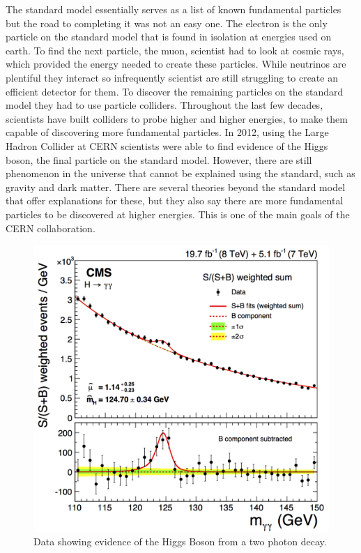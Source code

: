 The standard model essentially serves as a list of known fundamental particles but the road to completing it was not an easy one. The electron is the only particle on the standard model that is found in isolation at energies used on earth. To find the next particle, the muon, scientist had to look at cosmic rays, which provided the energy needed to create these particles. While neutrinos are plentiful they interact so infrequently scientist are still struggling to create an efficient detector for them. To discover the remaining particles on the standard model they had to use particle colliders. Throughout the last few decades, scientists have built colliders to probe higher and higher energies, to make them capable of discovering more fundamental particles. In 2012, using the Large Hadron Collider at CERN scientists were able to find evidence of the Higgs boson, the final particle on the standard model. However, there are still phenomenon in the universe that cannot be explained using the standard, such as gravity and dark matter. There are several theories beyond the standard model that offer explanations for these, but they also say there are more fundamental particles to be discovered at higher energies. This is one of the main goals of the CERN collaboration. 

\begin{figure}
\centering
\includegraphics[width=\linewidth]{higgsmeasurement.png}
\caption{Data showing evidence of the Higgs Boson from a two photon decay.}
\label{fig:higgs}
\end{figure} 

